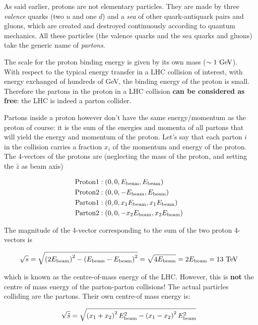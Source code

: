 As said earlier, protons are not elementary particles. They are made by three \textit{valence} quarks (two $u$ and one $d$) and a \textit{sea} of other quark-antiquark pairs and gluons, which are created and destroyed continuously according to quantum mechanics. All these particles (the valence quarks and the sea quarks and gluons) take the generic name of \textit{partons}. 

The scale for the proton binding energy is given by its own mass ($\sim 1\ \text{Ge\kern -0.1em V}$). With respect to the typical energy transfer in a LHC collision of interest, with energy exchanged of hundreds of GeV, the binding energy of the proton is small. Therefore the partons in the proton in a LHC collision \textbf{can be considered as free}: the LHC is indeed a parton collider. 

Partons inside a proton however don't have the same energy/momentum as the proton of course: it is the sum of the energies and momenta of all partons that will yield the energy and momentum of the proton. Let's say that each parton $i$ in the collision carries a fraction $x_i$ of the momentum and energy of the proton. The 4-vectors of the protons are (neglecting the mass of the proton, and setting the $\hat{z}$ as beam axis) 

\begin{align*}
\mathrm{Proton 1}&: \left(0,0,E_{\mathrm{beam}},E_{\mathrm{beam}}\right) \\
\mathrm{Proton 2}&: \left(0,0,-E_{\mathrm{beam}},E_{\mathrm{beam}}\right) \\
\mathrm{Parton 1}&: \left(0,0,x_1E_{\mathrm{beam}},x_1E_{\mathrm{beam}}\right) \\
\mathrm{Parton 2}&: \left(0,0,-x_2E_{\mathrm{beam}},x_2E_{\mathrm{beam}}\right) \\
\end{align*}

The magnitude of the 4-vector corresponding to the sum of the two proton 4-vectors is 

\begin{align*}
\sqrt{s} = \sqrt{\left(2E_{\mathrm{beam}}\right)^2 - \left(E_{\mathrm{beam}}-E_{\mathrm{beam}}\right)^2} = \sqrt{4E_{\mathrm{beam}}} = 2E_{\mathrm{beam}} = 13\ \text{Te\kern -0.1em V}
\end{align*}

\noindent which is known as the centre-of-mass energy of the LHC. However, this is \textbf{not} the centre of mass energy of the parton-parton collisions! The actual particles colliding are the partons. Their own centre-of mass energy is:

\begin{align*}
\sqrt{\hat{s}} = \sqrt{\left( x_1 + x_2 \right) ^2 E_{\mathrm{beam}}^2 - \left( x_1 - x_2\right)^2 E_{\mathrm{beam}}^2}
\end{align*}

